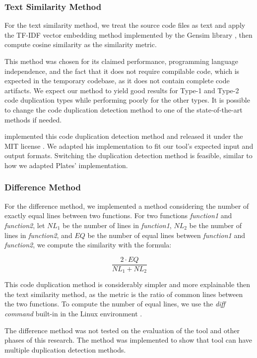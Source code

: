 \subsubsection{Text Similarity Method}

For the text similarity method, we treat the source code files 
as text and apply the TF-IDF vector embedding method implemented by the 
Gensim library \citep{gensim}, then compute cosine similarity as the 
similarity metric.

This method was chosen for its claimed performance, 
programming language independence, and the fact that it does not require 
compilable code, which is expected in the temporary codebase, as it does 
not contain complete code artifacts. We expect our method to yield good 
results for Type-1 and Type-2 code duplication types while performing 
poorly for the other types. It is possible to change the code duplication 
detection method to one of the state-of-the-art methods if needed.

\cite{platistool} implemented this code duplication detection method and 
released it under the MIT license \citep{mitlicense}. We adapted his 
implementation to fit our tool's expected input and output formats. 
Switching the duplication detection method is feasible, similar to how 
we adapted Plates' implementation.

\subsubsection{Difference Method}

For the difference method, 
we implemented a method considering the number of exactly equal lines between two functions.
For two functions \textit{function1} and \textit{function2}, let $NL_1$ be the number of lines in \textit{function1},
$NL_2$ be the number of lines in \textit{function2}, and $EQ$ be the number of equal lines between \textit{function1} and
\textit{function2}, we compute the similarity with the formula:

$$\frac{2 \cdot EQ}{NL_1 + NL_2}$$

This code duplication method is considerably simpler and more explainable then the text similarity method, 
as the metric is the ratio of common lines between the two functions. To compute the number of equal lines, we use
the \textit{diff command} built-in in the Linux environment \citep{diffcommand}.

The difference method was not tested on the evaluation of the tool and other phases of this research. 
The method was implemented to show that tool can have multiple duplication detection methods.

